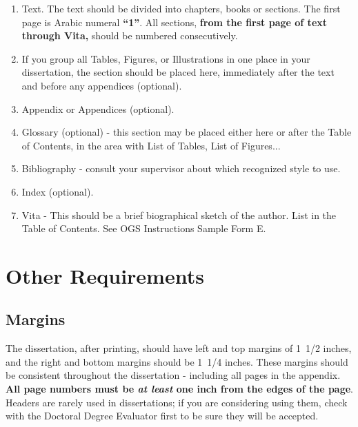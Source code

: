 \begin{enumerate}
\item Text. 
%
The text should be divided into chapters, books or sections. The first page
is Arabic numeral \textbf{``1''}. All sections, \textbf{from the first page
of text through Vita,} should be numbered consecutively.

\item If you group all Tables, 
%
Figures, 
%
or Illustrations 
%
in one place in your dissertation, the section should be placed 
here, immediately after the text and before any appendices 
(optional).

\item Appendix or Appendices 
%
%
(optional).

\item Glossary 
%
(optional) - this section may be placed either here or after the Table
of Contents, in the area with List of Tables, List of Figures...

\item Bibliography
%
- consult your supervisor about which recognized style to use.

\item Index
%
(optional).

\item Vita -
%
This should be a brief biographical sketch of the author. List in the
Table of Contents. See OGS Instructions Sample Form E.


\end{enumerate}


\section{Other Requirements}
%


\subsection{Margins}
%

The dissertation, after printing, should have left and top margins of
1~1/2 inches, and the right and bottom margins should be 1~1/4 inches.
These margins should be consistent throughout the dissertation - including
all pages in the appendix. \textbf{All page numbers must be \textit{at
least} one inch from the edges of the page}. Headers are rarely used in
dissertations; if you are considering using them, check with the Doctoral
Degree Evaluator first to be sure they will be accepted.


